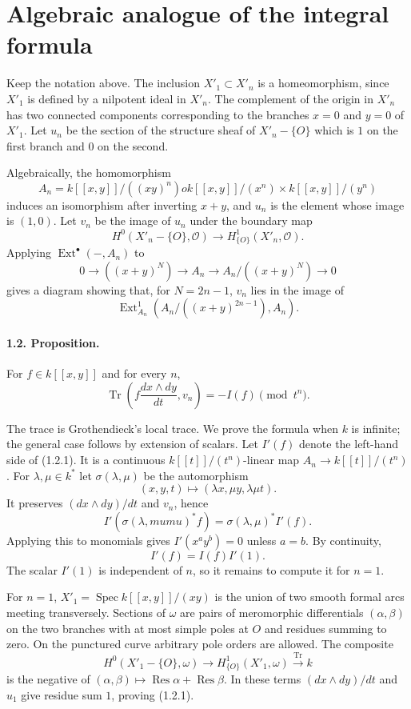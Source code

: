 \documentclass[11pt]{article}
\theoremstyle{remark}
\DeclareMathOperator{\Spec}{Spec}
\DeclareMathOperator{\Ext}{Ext}
\DeclareMathOperator{\Res}{Res}
\newcommand{\OO}{\mathcal O}
\DeclareMathOperator{\Tr}{Tr}
\begin{document}
\section{Algebraic analogue of the integral formula}

Keep the notation above. The inclusion $X'_1\subset X'_n$ is a homeomorphism, since $X'_1$ is defined by a nilpotent ideal in $X'_n$. The complement of the origin in $X'_n$ has two connected components corresponding to the branches $x=0$ and $y=0$ of $X'_1$. Let $u_n$ be the section of the structure sheaf of $X'_n-\{O\}$ which is $1$ on the first branch and $0$ on the second.

Algebraically, the homomorphism
\[
 A_n=k[[x,y]]/((xy)^n)	o k[[x,y]]/(x^n)\times k[[x,y]]/(y^n)
\]
induces an isomorphism after inverting $x+y$, and $u_n$ is the element whose image is $(1,0)$. Let $v_n$ be the image of $u_n$ under the boundary map
\[
 H^0(X'_n-\{O\},\OO)\longrightarrow H^1_{\{O\}}(X'_n,\OO).
\]
Applying $\Ext^\bullet(-,A_n)$ to
\[
 0\to ((x+y)^N)\to A_n\to A_n/((x+y)^N)\to0
\]
gives a diagram showing that, for $N=2n-1$, $v_n$ lies in the image of
\[
 \Ext^1_{A_n}(A_n/((x+y)^{2n-1}),A_n).
\]

\paragraph{1.2. Proposition.}
For $f\in k[[x,y]]$ and for every $n$,
\begin{equation}\tag{1.2.1}
 \Tr\left(f\frac{dx\wedge dy}{dt},v_n\right)=-I(f)\pmod {t^n}.
\end{equation}

The trace is Grothendieck's local trace. We prove the formula when $k$ is infinite; the general case follows by extension of scalars. Let $I'(f)$ denote the left-hand side of (1.2.1). It is a continuous $k[[t]]/(t^n)$-linear map $A_n\to k[[t]]/(t^n)$. For $\lambda,\mu\in k^*$ let $\sigma(\lambda,\mu)$ be the automorphism
\[
 (x,y,t)\mapsto(\lambda x,\mu y,\lambda\mu t).
\]
It preserves $(dx\wedge dy)/dt$ and $v_n$, hence
\begin{equation}\tag{1.2.2}
 I'(\sigma(\lambda,mumu)^*f)=\sigma(\lambda,\mu)^*I'(f).
\end{equation}
Applying this to monomials gives $I'(x^ay^b)=0$ unless $a=b$. By continuity,
\[
 I'(f)=I(f)I'(1).
\]
The scalar $I'(1)$ is independent of $n$, so it remains to compute it for $n=1$.

For $n=1$, $X'_1=\Spec k[[x,y]]/(xy)$ is the union of two smooth formal arcs meeting transversely. Sections of $\omega$ are pairs of meromorphic differentials $(\alpha,\beta)$ on the two branches with at most simple poles at $O$ and residues summing to zero. On the punctured curve arbitrary pole orders are allowed. The composite
\[
 H^0(X'_1-\{O\},\omega)\to H^1_{\{O\}}(X'_1,\omega)\xrightarrow{\Tr} k
\]
is the negative of $(\alpha,\beta)\mapsto \Res\alpha+\Res\beta$. In these terms $(dx\wedge dy)/dt$ and $u_1$ give residue sum $1$, proving (1.2.1).
\end{document}
